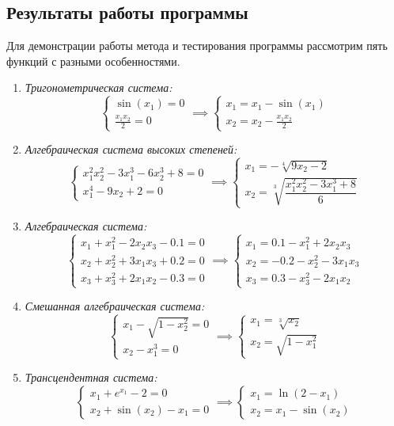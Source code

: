 \subsection{Результаты работы программы}

Для демонстрации работы метода и тестирования программы рассмотрим пять функций с разными особенностями.

\begin{enumerate}
    \item \textit{Тригонометрическая система:}
    $$\begin{cases} \sin(x_1) = 0 \\ \frac{x_1 x_2}{2} = 0 \end{cases} \implies \begin{cases} x_1 = x_1 - \sin(x_1) \\ x_2 = x_2 - \frac{x_1 x_2}{2} \end{cases}$$

    \item \textit{Алгебраическая система высоких степеней:}
    $$\begin{cases} x_1^2 x_2^2 - 3x_1^3 - 6x_2^3 + 8 = 0 \\ x_1^4 - 9x_2 + 2 = 0 \end{cases} \implies \begin{cases} x_1 = -\sqrt[4]{9x_2 - 2} \\ x_2 = \sqrt[3]{\dfrac{x_1^2 x_2^2 - 3x_1^3 + 8}{6}} \end{cases}$$

    \item \textit{Алгебраическая система:}
    $$\begin{cases} x_1 + x_1^2 - 2x_2x_3 - 0.1 = 0 \\ x_2 + x_2^2 + 3x_1x_3 + 0.2 = 0 \\ x_3 + x_3^2 + 2x_1x_2 - 0.3 = 0 \end{cases} \implies \begin{cases} x_1 = 0.1 - x_1^2 + 2x_2x_3 \\ x_2 = -0.2 - x_2^2 - 3x_1x_3 \\ x_3 = 0.3 - x_3^2 - 2x_1x_2 \end{cases}$$

    \item \textit{Смешанная алгебраическая система:}
    $$\begin{cases} x_1 - \sqrt{1 - x_2^2} = 0 \\ x_2 - x_1^3 = 0 \end{cases} \implies \begin{cases} x_1 = \sqrt[3]{x_2} \\ x_2 = \sqrt{1 - x_1^2} \end{cases}$$

    \item \textit{Трансцендентная система:}
    $$\begin{cases} x_1 + e^{x_1} - 2 = 0 \\ x_2 + \sin(x_2) - x_1 = 0 \end{cases} \implies \begin{cases} x_1 = \ln(2 - x_1) \\ x_2 = x_1 - \sin(x_2) \end{cases}$$
\end{enumerate}

